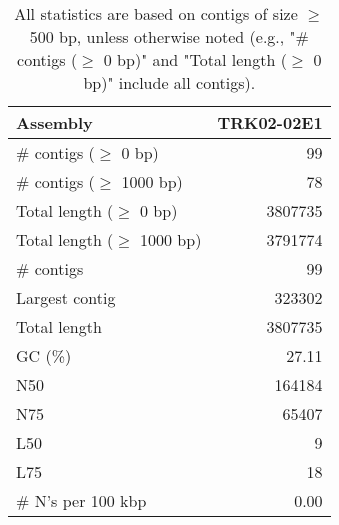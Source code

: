 \documentclass[12pt,a4paper]{article}
\begin{document}
\begin{table}[ht]
\begin{center}
\caption{All statistics are based on contigs of size $\geq$ 500 bp, unless otherwise noted (e.g., "\# contigs ($\geq$ 0 bp)" and "Total length ($\geq$ 0 bp)" include all contigs).}
\begin{tabular}{|l*{1}{|r}|}
\hline
Assembly & TRK02-02E1 \\ \hline
\# contigs ($\geq$ 0 bp) & 99 \\ \hline
\# contigs ($\geq$ 1000 bp) & 78 \\ \hline
Total length ($\geq$ 0 bp) & 3807735 \\ \hline
Total length ($\geq$ 1000 bp) & 3791774 \\ \hline
\# contigs & 99 \\ \hline
Largest contig & 323302 \\ \hline
Total length & 3807735 \\ \hline
GC (\%) & 27.11 \\ \hline
N50 & 164184 \\ \hline
N75 & 65407 \\ \hline
L50 & 9 \\ \hline
L75 & 18 \\ \hline
\# N's per 100 kbp & 0.00 \\ \hline
\end{tabular}
\end{center}
\end{table}
\end{document}
